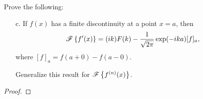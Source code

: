 \begin{problem}{2.5}
  Prove the following:
  \begin{enumerate}
    \item [c.] If $f(x)$ has a finite discontinuity at a point $x = a$, then
      \begin{align*}
        \mathscr{F}\left\{ {f'(x)} \right\} = (ik) F(k) - \frac{1}{\sqrt{2\pi}}\exp(-ika)[f]_a,
      \end{align*}
      where $[f]_a = f(a + 0) - f (a - 0).$

      Generalize this result for $\mathscr{F}\left\{ {f^{(n)}(x)} \right\}$.
  \end{enumerate}
\end{problem}

\begin{proof}
\end{proof}
\newpage
